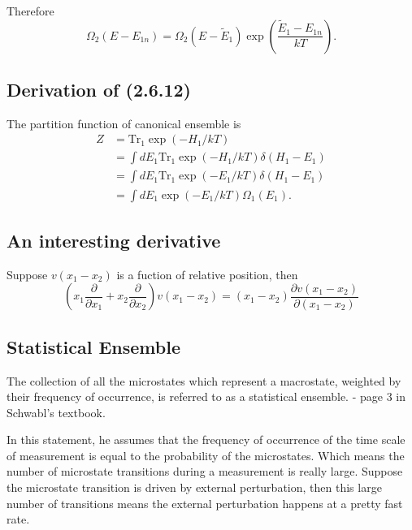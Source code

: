 \documentclass[10pt]{article}
\begin{document}
Therefore
\begin{equation}
	\Omega_2(E - E_{1n}) = \Omega_2(E - \tilde{E}_1) \exp\left(\frac{\tilde{E}_1 - E_{1n}}{kT}\right).
\end{equation}

\subsection{Derivation of (2.6.12)}

The partition function of canonical ensemble is
\begin{align*}
	Z &= \mathrm{Tr_1}\exp(-H_1/kT) \\
	&= \int dE_1 \mathrm{Tr_1}\exp(-H_1/kT) \delta(H_1 - E_1) \\
	&= \int dE_1 \mathrm{Tr_1}\exp(-E_1/kT) \delta(H_1 - E_1) \\
	&= \int dE_1 \exp(-E_1/kT) \Omega_1(E_1).
\end{align*}

\subsection{An interesting derivative}

Suppose $v(x_1 - x_2)$ is a fuction of relative position, then
\begin{equation}
	\left(x_1 \frac{\partial}{\partial x_1} + x_2 \frac{\partial}{\partial x_2}\right) v(x_1 - x_2) = (x_1 - x_2) \frac{\partial v(x_1 - x_2)}{\partial (x_1 - x_2)}
\end{equation}

\subsection{Statistical Ensemble}

\begin{remark}
	The collection of all the microstates which represent a macrostate, weighted by their frequency of occurrence, is referred to as a statistical ensemble. - page 3 in Schwabl's textbook.
\end{remark}

In this statement, he assumes that the frequency of occurrence of the time scale of measurement is equal to the probability of the microstates. Which means the number of microstate transitions during a measurement is really large. Suppose the microstate transition is driven by external perturbation, then this large number of transitions means the external perturbation happens at a pretty fast rate.
\end{document}
